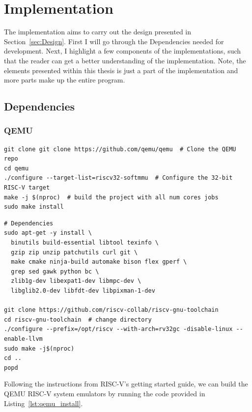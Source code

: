 \section{Implementation}
The implementation aims to carry out the design presented in
Section~\ref{sec:Design}. First I will go through the Dependencies needed for
development. Next, I highlight a few components of the implementations, such
that the reader can get a better understanding of the implementation. Note, the
elements presented within this thesis is just a part of the implementation and
more parts make up the entire program.

\subsection{Dependencies}
\subsubsection*{QEMU}
\begin{lstlisting}[caption=Installing QEMU, label=lst:qemu_install, float]
git clone git clone https://github.com/qemu/qemu  # Clone the QEMU repo
cd qemu
./configure --target-list=riscv32-softmmu  # Configure the 32-bit RISC-V target
make -j $(nproc)  # build the project with all num cores jobs
sudo make install
\end{lstlisting}
\begin{lstlisting}[caption=Installing LLVM compiler infastructure with RISC-V
32-bit as native target., label=lst:llvm_install, float]
# Dependencies
sudo apt-get -y install \
  binutils build-essential libtool texinfo \
  gzip zip unzip patchutils curl git \
  make cmake ninja-build automake bison flex gperf \
  grep sed gawk python bc \
  zlib1g-dev libexpat1-dev libmpc-dev \
  libglib2.0-dev libfdt-dev libpixman-1-dev

git clone https://github.com/riscv-collab/riscv-gnu-toolchain
cd riscv-gnu-toolchain  # change directory
./configure --prefix=/opt/riscv --with-arch=rv32gc -disable-linux --enable-llvm
sudo make -j$(nproc)
cd ..
popd
\end{lstlisting}
Following the instructions from RISC-V's getting started guide, we can build the
QEMU RISC-V system emulators by running the code provided in
Listing~\ref{lst:qemu_install}\cite{RISC-V_GS}.

